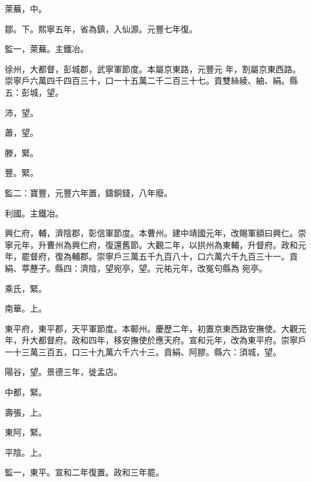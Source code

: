 \begin{pinyinscope}
 萊蕪，中。



 鄒。下。熙寧五年，省為鎮，入仙源。元豐七年復。



 監一，萊蕪。主鐵冶。



 徐州，大都督，彭城郡，武寧軍節度。本屬京東路，元豐元
 年，割屬京東西路。崇寧戶六萬四千四百三十，口一十五萬二千二百三十七。貢雙絲綾、紬、絹。縣五：彭城，望。



 沛，望。



 蕭，望。



 滕，緊。



 豐。緊。



 監二：寶豐，元豐六年置，鑄銅錢，八年廢。



 利國。主鐵冶。



 興仁府，輔，濟陰郡，彰信軍節度。本曹州。建中靖國元年，改賜軍額曰興仁。崇寧元年，升曹州為興仁府，復還舊節。大觀二年，以拱州為東輔，升督府。政和元年，罷督府，復為輔郡。崇寧戶三萬五千九百八十，口六萬六千九百三十一。貢絹、葶藶子。縣四：濟陰，望宛亭，望。元祐元年，改冤句縣為
 宛亭。



 乘氏，緊。



 南華。上。



 東平府，東平郡，天平軍節度。本鄆州。慶歷二年，初置京東西路安撫使。大觀元年，升大都督府。政和四年，移安撫使於應天府。宣和元年，改為東平府。崇寧戶一十三萬三百五，口三十九萬六千六十三。貢絹、阿膠。縣六：須城，望。



 陽谷，望。景德三年，徙孟店。



 中都，緊。



 壽張，上。



 東阿，緊。



 平陰。上。



 監一，東平。宣和二年復置。政和三年罷。




\end{pinyinscope}
